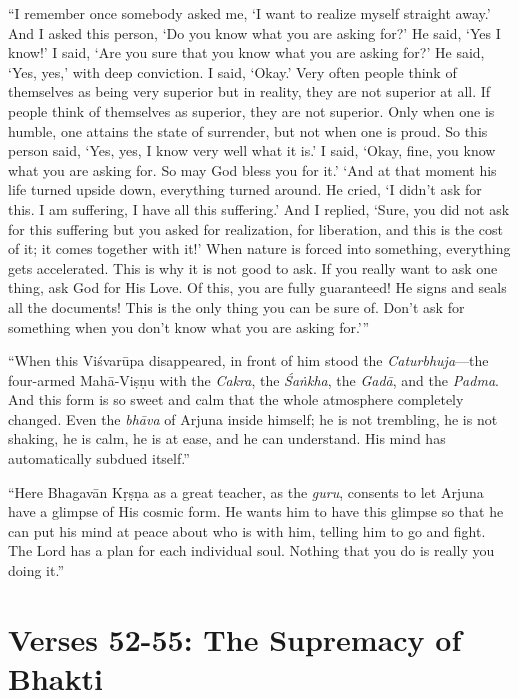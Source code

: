 \documentclass[12pt, twoside, openright]{memoir}
\begin{document}
\enquote{I remember once somebody asked me, \enquote{I want to realize myself straight away.} And I asked this person, \enquote{Do you know what you are asking for?} He said, \enquote{Yes I know!} I said, \enquote{Are you sure that you know what you are asking for?} He said, \enquote{Yes, yes,} with deep conviction. I said, \enquote{Okay.} Very often people think of themselves as being very superior but in reality, they are not superior at all. If people think of themselves as superior, they are not superior. Only when one is humble, one attains the state of surrender, but not when one is proud. So this person said, \enquote{Yes, yes, I know very well what it is.} I said, \enquote{Okay, fine, you know what you are asking for. So may God bless you for it.} \enquote{And at that moment his life turned upside down, everything turned around. He cried, ‘I didn’t ask for this. I am suffering, I have all this suffering.’ And I replied, ‘Sure, you did not ask for this suffering but you asked for realization, for liberation, and this is the cost of it; it comes together with it!’ When nature is forced into something, everything gets accelerated. This is why it is not good to ask. If you really want to ask one thing, ask God for His Love. Of this, you are fully guaranteed! He signs and seals all the documents! This is the only thing you can be sure of. Don’t ask for something when you don’t know what you are asking for.}}

\enquote{When this Viśvarūpa disappeared, in front of him stood the \textit{Caturbhuja}---the four-armed Mahā-Viṣṇu with the \textit{Cakra}, the \textit{Śaṅkha}, the \textit{Gadā}, and the \textit{Padma}. And this form is so sweet and calm that the whole atmosphere completely changed. Even the \textit{bhāva} of Arjuna inside himself; he is not trembling, he is not shaking, he is calm, he is at ease, and he can understand. His mind has automatically subdued itself.}

\enquote{Here Bhagavān Kṛṣṇa as a great teacher, as the \textit{guru}, consents to let Arjuna have a glimpse of His cosmic form. He wants him to have this glimpse so that he can put his mind at peace about who is with him, telling him to go and fight. The Lord has a plan for each individual soul. Nothing that you do is really you doing it.}


\section{Verses 52-55: The Supremacy of Bhakti}\label{sec-verses-52-55-the-supremacy-of-bhakti}
\end{document}
